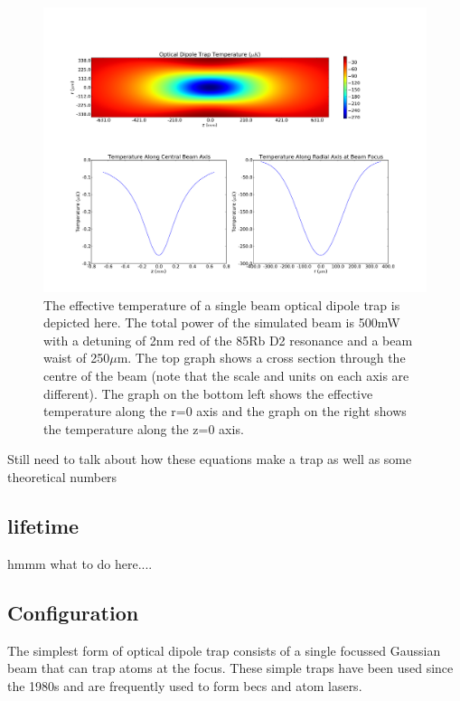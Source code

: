 \begin{figure}
\label{fig:dipolepotential}
\centering
\includegraphics[width=18cm]{figs/dipolepotential.pdf}
\caption{The effective temperature of a single beam optical dipole trap is depicted here. The total power of the simulated beam is 500mW with a detuning of 2nm red of the 85Rb D2 resonance and a beam waist of 250$\mu$m. The top graph shows a cross section through the centre of the beam (note that the scale and units on each axis are different). The graph on the bottom left shows the effective temperature along the r=0 axis and the graph on the right shows the temperature along the z=0 axis.}
\end{figure}

{\color{red} Still need to talk about how these equations make a trap as well as some theoretical numbers}

\subsection{lifetime}

{\color{red} hmmm what to do here....}

\subsection{Configuration}

The simplest form of optical dipole trap consists of a single focussed Gaussian beam that can trap atoms at the focus. These simple traps have been used since the 1980s\cite{chu_experimental_1986} and are frequently used to form \glspl{bec} and atom lasers\cite{chikkatur_continuous_2002, kleine_buning_slow_2010, lin_rapid_2009}.

